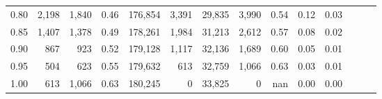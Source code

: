 \begin{tabular}{rrrrrrrrrrrrrr}
0.80 &   2,198 &  1,840 &  0.46 &  176,854 &    3,391 &  29,835 &   3,990 &  0.54 &  0.12 &      0.03 \\
0.85 &   1,407 &  1,378 &  0.49 &  178,261 &    1,984 &  31,213 &   2,612 &  0.57 &  0.08 &      0.02 \\
0.90 &     867 &    923 &  0.52 &  179,128 &    1,117 &  32,136 &   1,689 &  0.60 &  0.05 &      0.01 \\
0.95 &     504 &    623 &  0.55 &  179,632 &      613 &  32,759 &   1,066 &  0.63 &  0.03 &      0.01 \\
1.00 &     613 &  1,066 &  0.63 &  180,245 &        0 &  33,825 &       0 &   nan &  0.00 &      0.00 \\
\bottomrule
\end{tabular}
